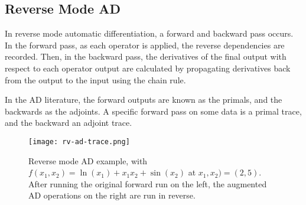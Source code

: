 \subsection{Reverse Mode AD}
In reverse mode automatic differentiation, a forward and backward pass occurs.
In the forward pass, as each operator is applied, the reverse dependencies are recorded.
Then, in the backward pass, the derivatives of the final output with respect to each operator output are calculated by propagating derivatives back from the output to the input using the chain rule.

In the AD literature, the forward outputs are known as the primals, and the backwards as the adjoints.
A specific forward pass on some data is a primal trace, and the backward an adjoint trace.

\begin{figure}[tb]
    \centering
    \texttt{[image: rv-ad-trace.png]}
    \caption{Reverse mode AD example, with \(f(x_1, x_2) = \ln(x_1) + x_1x_2 + \sin(x_2)\) at \(x_1, x_2) = (2, 5)\). After running the original forward run on the left, the augmented AD operations on the right are run in reverse. \cite[Table~3]{Baydin2015}}
    \label{fig:2-rv-ad-trace}
\end{figure}

